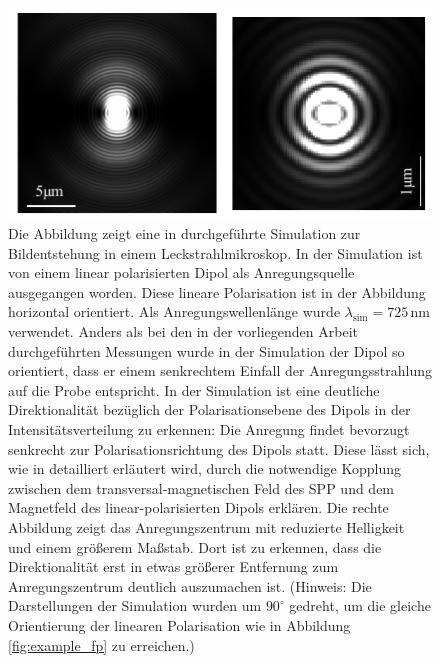 \documentclass[titlepage,  ngerman]{article}
\begin{document}
	\begin{figure}[h]
		\centering
		\includegraphics[width=0.9\linewidth]{"figures/Vergleich Bildentstehung"}
		\caption[Vergleich des Ortsbildes mit einer Simulation aus \cite{Hohenau.2011}]{Die Abbildung zeigt eine in \cite{Hohenau.2011} durchgeführte Simulation zur Bildentstehung in einem Leckstrahlmikroskop. In der Simulation ist von einem linear polarisierten Dipol als Anregungsquelle ausgegangen worden. Diese lineare Polarisation ist in der Abbildung horizontal orientiert. Als Anregungswellenlänge wurde $\lambda_\mathrm{sim}= 725\,\mathrm{nm}$ verwendet. Anders als bei den in der vorliegenden Arbeit durchgeführten Messungen wurde in der Simulation der Dipol so orientiert, dass er einem senkrechtem Einfall der Anregungsstrahlung auf die Probe entspricht. In der Simulation ist eine deutliche Direktionalität bezüglich der Polarisationsebene des Dipols in der Intensitätsverteilung zu erkennen: Die Anregung findet bevorzugt senkrecht zur Polarisationsrichtung des Dipols statt. Diese lässt sich, wie in \cite{Hohenau.2011} detailliert erläutert wird, durch die notwendige Kopplung zwischen dem transversal-magnetischen Feld des SPP und dem Magnetfeld des linear-polarisierten Dipols erklären. Die rechte Abbildung zeigt das Anregungszentrum mit reduzierte Helligkeit und einem größerem Maßstab. Dort ist zu erkennen, dass die Direktionalität erst in etwas größerer Entfernung zum Anregungszentrum deutlich auszumachen ist. (Hinweis: Die Darstellungen der Simulation wurden um $90^\circ$ gedreht, um die gleiche Orientierung der linearen Polarisation wie in Abbildung \ref{fig:example_fp} zu erreichen.)}
		\label{fig:vergleich-bildentstehung}
	\end{figure}
\end{document}

